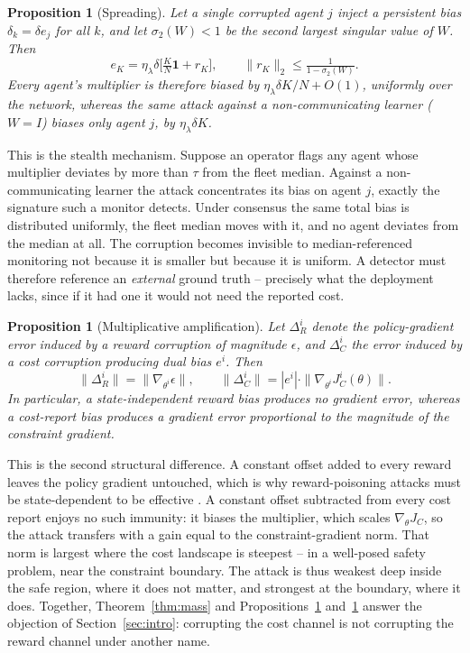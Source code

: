 \documentclass{article}
\newtheorem{proposition}[theorem]{Proposition}
\begin{document}
\begin{proposition}[Spreading]
\label{cor:spread}
Let a single corrupted agent $j$ inject a persistent bias $\delta_k = \delta e_j$ for all $k$, and let $\sigma_2(W)<1$ be the second largest singular value of $W$. Then
\begin{equation}
e_K = \eta_\lambda\delta\Big[\tfrac{K}{N}\mathbf{1} + r_K\Big], \qquad \|r_K\|_2 \le \tfrac{1}{1-\sigma_2(W)} .
\label{eq:spread}
\end{equation}
Every agent's multiplier is therefore biased by $\eta_\lambda\delta K/N + O(1)$, uniformly over the network, whereas the same attack against a non-communicating learner ($W = I$) biases only agent $j$, by $\eta_\lambda\delta K$.
\end{proposition}

This is the stealth mechanism. Suppose an operator flags any agent whose multiplier deviates by more than $\tau$ from the fleet median. Against a non-communicating learner the attack concentrates its bias on agent $j$, exactly the signature such a monitor detects. Under consensus the same total bias is distributed uniformly, the fleet median moves with it, and no agent deviates from the median at all. The corruption becomes invisible to median-referenced monitoring not because it is smaller but because it is uniform. A detector must therefore reference an \emph{external} ground truth -- precisely what the deployment lacks, since if it had one it would not need the reported cost.

\begin{proposition}[Multiplicative amplification]
\label{prop:mult}
Let $\Delta^i_R$ denote the policy-gradient error induced by a reward corruption of magnitude $\epsilon$, and $\Delta^i_C$ the error induced by a cost corruption producing dual bias $e^i$. Then
\begin{equation}
\|\Delta^i_R\| = \|\nabla_{\theta^i}\epsilon\|, \qquad \|\Delta^i_C\| = |e^i|\cdot\|\nabla_{\theta^i} J^i_C(\theta)\| .
\label{eq:mult}
\end{equation}
In particular, a state-independent reward bias produces no gradient error, whereas a cost-report bias produces a gradient error proportional to the magnitude of the constraint gradient.
\end{proposition}

This is the second structural difference. A constant offset added to every reward leaves the policy gradient untouched, which is why reward-poisoning attacks must be state-dependent to be effective \citep{zhang2020adaptive}. A constant offset subtracted from every cost report enjoys no such immunity: it biases the multiplier, which scales $\nabla_\theta J_C$, so the attack transfers with a gain equal to the constraint-gradient norm. That norm is largest where the cost landscape is steepest -- in a well-posed safety problem, near the constraint boundary. The attack is thus weakest deep inside the safe region, where it does not matter, and strongest at the boundary, where it does. Together, Theorem~\ref{thm:mass} and Propositions~\ref{cor:spread} and~\ref{prop:mult} answer the objection of Section~\ref{sec:intro}: corrupting the cost channel is not corrupting the reward channel under another name.
\end{document}
